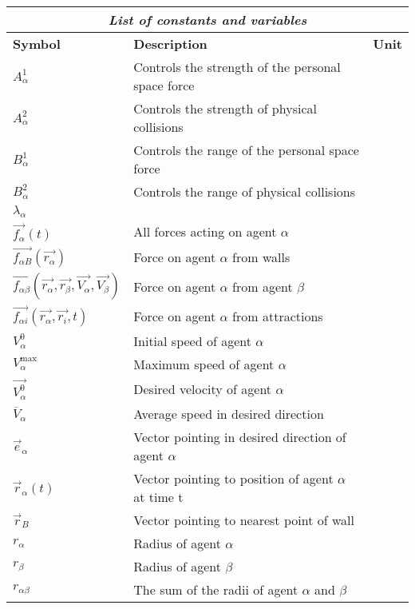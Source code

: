 \begin{center}
\begin{tabular}{lll}
\hline
\multicolumn{3}{|c|}{\emph{List of constants and variables}}\\
\hline
\small{\textbf{Symbol}} & \small{\textbf{Description}} & \small{\textbf{Unit}}\\
\hline
$A_{\alpha}^{1}$ & \small{Controls the strength of the personal space force}\\
\hline
$A_{\alpha}^{2}$ & \small{Controls the strength of physical collisions}  & \\
\hline
$B_{\alpha}^{1}$ & \small{Controls the range of the personal space force} & \\
\hline
$B_{\alpha}^{2}$ & \small{Controls the range of physical collisions} & \\
\hline
$\lambda_{\alpha}$ &  & \\
\hline
$\vec{f_{\alpha}} \left( t \right)$ & All forces acting on agent $\alpha$  & \\
\hline
$\vec{f_{\alpha B}} \left( \vec{r_{\alpha}} \right)$ & Force on agent $\alpha$ from walls & \\
\hline
$\vec{f_{\alpha \beta}} \left( \vec{r_{\alpha}}, \vec{r_{\beta}}, \vec{V_{\alpha}}, \vec{V_{\beta}} \right)$ & Force on agent $\alpha$ from agent $\beta$ & \\
\hline
$\vec{f_{\alpha i}} \left( \vec{r_{\alpha}}, \vec{r_{i}}, t \right)$ & Force on agent $\alpha$ from attractions & \\
\hline
$V_{\alpha}^{0}$ & Initial speed of agent $\alpha$ & \\
\hline
$V_{\alpha}^{\text{max}}$ & Maximum speed of agent $\alpha$ & \\
\hline
$\vec{V_{\alpha}^{\text{0}}}$ & Desired velocity of agent $\alpha$ & \\
\hline
$\overline{V}_{\alpha}$ & Average speed in desired direction & \\
\hline
$\vec{e}_{\alpha}$ & Vector pointing in desired direction of agent $\alpha$ & \\
\hline
$\vec{r}_{\alpha}\left( t \right) $ & Vector pointing to position of agent $\alpha$ at time t & \\
\hline
$\vec{r}_{B}$ & Vector pointing to nearest point of wall & \\
\hline
$r_{\alpha}$ & Radius of agent $\alpha$ & \\
\hline
$r_{\beta}$ & Radius of agent $\beta$ & \\
\hline
$r_{\alpha \beta}$ & The sum of the radii of agent $\alpha$ and $\beta$ & \\

\end{tabular}
\end{center}
